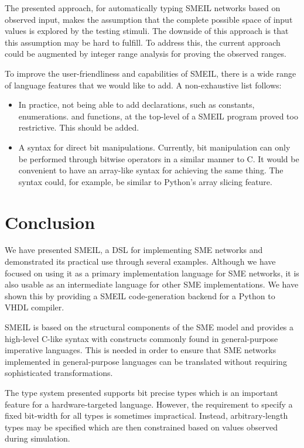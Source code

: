 The presented approach, for automatically typing SMEIL networks based on
observed input, makes the assumption that the complete possible space of input
values is explored by the testing stimuli. The downside of this approach is that
this assumption may be hard to fulfill. To address this, the current approach
could be augmented by integer range analysis for proving the observed ranges.

To improve the user-friendliness and capabilities of SMEIL, there is a wide
range of language features that we would like to add. A non-exhaustive list
follows:
\begin{itemize}
\item In practice, not being able to add declarations, such as constants,
  enumerations. and functions, at the top-level of a SMEIL program proved too
  restrictive. This should be added.
\item A syntax for direct bit manipulations. Currently, bit manipulation can
  only be performed through bitwise operators in a similar manner to C. It would
  be convenient to have an array-like syntax for achieving the same thing. The
  syntax could, for example, be similar to Python's array slicing feature.
\end{itemize}

\section{Conclusion}
We have presented SMEIL, a DSL for implementing SME networks and demonstrated
its practical use through several examples. Although we have focused on using it
as a primary implementation language for SME networks, it is also usable as an
intermediate language for other SME implementations. We have shown this by
providing a SMEIL code-generation backend for a Python to VHDL compiler.

SMEIL is based on the structural components of the SME model and provides a
high-level C-like syntax with constructs commonly found in general-purpose
imperative languages. This is needed in order to ensure that SME networks
implemented in general-purpose languages can be translated without requiring
sophisticated transformations.

The type system presented supports bit precise types which is an important
feature for a hardware-targeted language. However, the requirement to
specify a fixed bit-width for all types is sometimes impractical. Instead,
arbitrary-length types may be specified which are then constrained based on
values observed during simulation.

